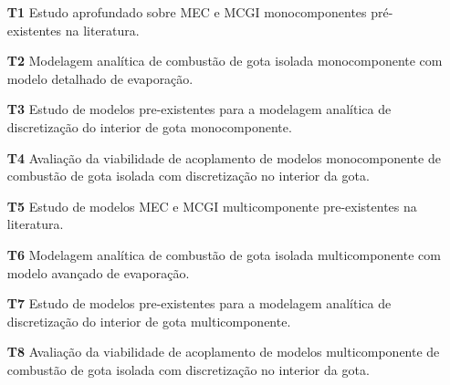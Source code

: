\begin{itemize}
\setlength{\itemsep}{0cm}
\item[\textbf{T1}] Estudo aprofundado sobre MEC e MCGI monocomponentes pré-existentes na literatura.%
\item[\textbf{T2}] Modelagem analítica de combustão de gota isolada monocomponente com modelo detalhado de evaporação. %
\item[\textbf{T3}] Estudo de modelos pre-existentes para a modelagem  analítica de discretização do interior de gota monocomponente.%
\item[\textbf{T4}] Avaliação da viabilidade de acoplamento de modelos monocomponente de combustão de gota isolada com discretização no interior da gota.%

\item[\textbf{T5}] Estudo de modelos MEC e MCGI multicomponente pre-existentes na literatura.%
\item[\textbf{T6}] Modelagem analítica de combustão de gota isolada multicomponente com modelo avançado de evaporação. %
\item[\textbf{T7}] Estudo de modelos pre-existentes para a modelagem analítica de discretização do interior de gota multicomponente.%
\item[\textbf{T8}] Avaliação da viabilidade de acoplamento de modelos multicomponente de combustão de gota isolada com discretização no interior da gota. 


\end{itemize}
